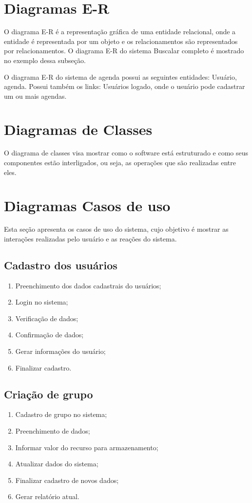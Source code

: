 \section{Diagramas E-R}
O diagrama E-R é a representação gráfica de uma entidade relacional, onde a entidade é representada por um objeto e os relacionamentos são representados por relacionamentos. O diagrama E-R do sistema Buscalar completo é mostrado no exemplo dessa subseção.

O diagrama E-R do sistema de agenda possui as seguintes entidades: Usuário, agenda. Possui também os links: Usuários logado, onde o usuário pode cadastrar um ou mais agendas.


\section{Diagramas de Classes}
O diagrama de classes visa mostrar como o software está estruturado e como seus componentes estão interligados, ou seja, as operações que são realizadas entre eles.

\section{Diagramas Casos de uso}


Esta seção apresenta os casos de uso do sistema, cujo objetivo é mostrar as interações realizadas pelo usuário e as reações do sistema.


\subsection{Cadastro dos usuários}
\begin{enumerate}
      \item Preenchimento dos dados cadastrais do usuários;
      \item Login no sistema;
      \item Verificação de dados;
      \item Confirmação de dados;
      \item Gerar informações do usuário;
      \item Finalizar cadastro.
\end{enumerate}

\subsection{Criação de grupo}
\begin{enumerate}
      \item Cadastro de grupo no sistema;
      \item Preenchimento de dados;
      \item Informar valor do recurso para armazenamento;
      \item Atualizar dados do sistema;
      \item Finalizar cadastro de novos dados;
      \item Gerar relatório atual.
\end{enumerate}


